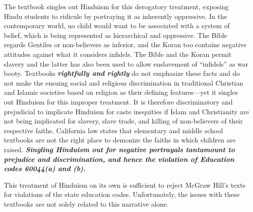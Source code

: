 The textbook singles out Hinduism for this derogatory treatment, exposing Hindu students to ridicule by portraying it as inherently oppressive. In the contemporary world, no child would want to be associated with a system of belief, which is being represented as hierarchical and oppressive. The Bible regards Gentiles or non-believers as inferior, and the Koran too contains negative attitudes against what it considers infidels. The Bible and the Koran permit slavery and the latter has also been used to allow enslavement of “infidels” as war booty. Textbooks \textit{\textbf{rightfully and rightly}} do not emphasize these facts and do not make the ensuing social and religious discrimination in traditional Christian and Islamic societies based on religion as their defining features—yet it singles out Hinduism for this improper treatment. It is therefore discriminatory and prejudicial to implicate Hinduism for caste inequities if Islam and Christianity are not being implicated for slavery, slave trade, and killing of non-believers of their respective faiths. California law states that elementary and middle school textbooks are not the right place to demonize the faiths in which children are raised. \textit{\textbf{Singling Hinduism out for negative portrayals tantamount to prejudice and discrimination, and hence the violation of Education codes 60044(a) and (b).}} 

This treatment of Hinduism on its own is sufficient to reject McGraw Hill’s texts for violations of the state education codes. Unfortunately, the issues with these textbooks are not solely related to this narrative alone.

